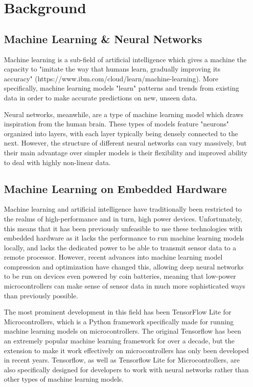 \section{Background}\label{sec:background}
\subsection{Machine Learning \& Neural Networks}\label{subsec:machine-learning-&-neural-networks}
Machine learning is a sub-field of artificial intelligence which gives a machine the capacity to "imitate the way that humans learn, gradually improving its accuracy" (https://www.ibm.com/cloud/learn/machine-learning).
More specifically, machine learning models "learn" patterns and trends from existing data in order to make accurate predictions on new, unseen data.

Neural networks, meanwhile, are a type of machine learning model which draws inspiration from the human brain.
These types of models feature "neurons" organized into layers, with each layer typically being densely connected to the next.
However, the structure of different neural networks can vary massively, but their main advantage over simpler models is their flexibility and improved ability to deal with highly non-linear data.

\subsection{Machine Learning on Embedded Hardware}\label{subsec:machine-learning-on-microcontrollers}
Machine learning and artificial intelligence have traditionally been restricted to the realms of high-performance and in turn, high power devices.
Unfortunately, this means that it has been previously unfeasible to use these technologies with embedded hardware as it lacks the performance to run machine learning models locally, and lacks the dedicated power to be able to transmit sensor data to a remote processor.
However, recent advances into machine learning model compression and optimization have changed this, allowing deep neural networks to be run on devices even powered by coin batteries, meaning that low-power microcontrollers can make sense of sensor data in much more sophisticated ways than previously possible.

The most prominent development in this field has been TensorFlow Lite for Microcontrollers, which is a Python framework specifically made for running machine learning models on microcontrollers.
The original Tensorflow has been an extremely popular machine learning framework for over a decade, but the extension to make it work effectively on microcontrollers has only been developed in recent years.
Tensorflow, as well as Tensorflow Lite for Microcontrollers, are also specifically designed for developers to work with neural networks rather than other types of machine learning models.

